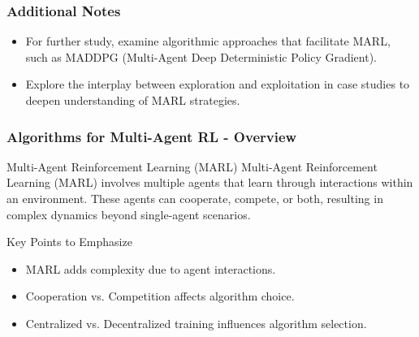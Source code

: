 \documentclass[aspectratio=169]{beamer}
\begin{document}
\begin{frame}[fragile]
    \frametitle{Additional Notes}
    \begin{itemize}
        \item For further study, examine algorithmic approaches that facilitate MARL, such as MADDPG (Multi-Agent Deep Deterministic Policy Gradient).
        \item Explore the interplay between exploration and exploitation in case studies to deepen understanding of MARL strategies.
    \end{itemize}
\end{frame}

\begin{frame}[fragile]
    \frametitle{Algorithms for Multi-Agent RL - Overview}
    \begin{block}{Multi-Agent Reinforcement Learning (MARL)}
        Multi-Agent Reinforcement Learning (MARL) involves multiple agents that learn through interactions within an environment.
        These agents can cooperate, compete, or both, resulting in complex dynamics beyond single-agent scenarios.
    \end{block}
    \begin{block}{Key Points to Emphasize}
        \begin{itemize}
            \item MARL adds complexity due to agent interactions.
            \item Cooperation vs. Competition affects algorithm choice.
            \item Centralized vs. Decentralized training influences algorithm selection.
        \end{itemize}
    \end{block}
\end{frame}
\end{document}
